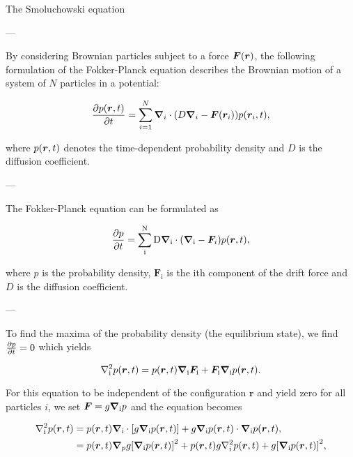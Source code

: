 The Smoluchowski equation

---

By considering Brownian particles subject to a force $\bm{F}\qty(\bm{r})$, the following formulation of the Fokker-Planck equation describes the Brownian motion of a system of $N$ particles in a potential: 

\begin{equation}
    \pdv{p \qty(\bm{r}, t)}{t} = \sum_{i=1}^N \grad_i \cdot \qty(D \grad_i - \bm{F}\qty(\bm{r}_i)) p \qty(\bm{r}_i, t),
\end{equation}

where $p \qty(\bm{r}, t)$ denotes the time-dependent probability density and $D$ is the diffusion coefficient. 

---

The Fokker-Planck equation can be formulated as

\begin{equation}\label{eq:fokker-planck}
    \pdv{p}{t} = \sum_{\mathrm{i}}^{\mathrm{N}}\mathrm{D}\grad_{\mathrm{i}}\cdot\qty(\grad_{\mathrm{i}}-\bm{F}_i)p(\bm{r}, t), 
\end{equation}

where $p$ is the probability density, $\bm{F}_{\mathrm{i}}$ is the $\mathrm{i}$th component of the drift force and $D$ is the diffusion coefficient. 

---

To find the maxima of the probability density (the equilibrium state), we find $\pdv{p}{t} = 0$ which yields

\begin{equation*}
    \laplacian_{\mathrm{i}} p(\bm{r}, t) = p(\bm{r}, t)\grad_{\mathrm{i}}\bm{F}_{\mathrm{i}} + \bm{F}_{\mathrm{i}}\grad_{\mathrm{i}}p(\bm{r}, t). 
\end{equation*}

For this equation to be independent of the configuration $\bm{r}$ and yield zero for all particles $i$, we set $\bm{F} = g\grad_{\mathrm{i}}p$ and the equation becomes 

\begin{align*}
    \laplacian_{\mathrm{i}}p(\bm{r}, t) &= p(\bm{r}, t)\grad_{\mathrm{i}}\cdot\qty[g\grad_{\mathrm{i}}p(\bm{r}, t)] + g\grad_{\mathrm{i}}p(\bm{r}, t)\cdot\grad_{\mathrm{i}}p(\bm{r}, t),
    \\
    &= p(\bm{r}, t)\grad_{p}g\qty[\grad_{\mathrm{i}}p(\bm{r}, t)]^2 + p(\bm{r}, t)g\laplacian_{\mathrm{i}}p(\bm{r}, t) + g\qty[\grad_{\mathrm{i}}p(\bm{r}, t)]^2, 
\end{align*} 

